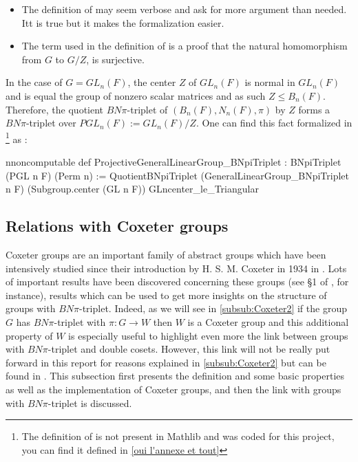 \begin{commentary}
    \begin{itemize}
        \item 
    The definition of  may seem verbose and ask for more argument than needed. Itt is true but it makes the formalization easier. 

\item The term   used in the definition of  is a proof that the natural homomorphism from $G$ to $G / Z$,  is surjective.
    \end{itemize}
\end{commentary}


\begin{ex}
    In the case of $G = GL_n(F)$, the center $Z$ of $GL_n(F)$ is normal in $GL_n(F)$ and is equal the group of nonzero scalar matrices and as such $Z \le B_n(F)$. Therefore, the quotient $BN\pi$-triplet of $\left( B_n(F),N_n(F), \pi \right)$ by $Z$ forms a $BN\pi$-triplet over $PGL_n\left( F \right) := GL_n(F)/Z$.
One can find this fact formalized in \footnote{The definition of  is not present in Mathlib and was coded for this project, you can find it defined in \ref{oui l'annexe et tout}} as :
\begin{leancode}
nnoncomputable
def ProjectiveGeneralLinearGroup_BNpiTriplet : BNpiTriplet (PGL n F) (Perm n) :=
  QuotientBNpiTriplet (GeneralLinearGroup_BNpiTriplet n F) (Subgroup.center (GL n F))  GLncenter_le_Triangular
\end{leancode}  
\end{ex}


\subsection{Relations with Coxeter groups}

    Coxeter groups are an important family of abstract groups which have been intensively studied since their introduction by H. S. M. Coxeter in 1934 in \cite{coxeter_discrete_1934}. 
   Lots of important results have been discovered concerning these groups (see §1 of \cite{bourbaki_groupes_2007}, for instance), results which can be used to get more insights on the structure of groups with $BN\pi$-triplet.
   Indeed, as we will see in \ref{subsub:Coxeter2} if the group $G$ has $BN\pi$-triplet with $\pi : G \to W$ then $W$ is a Coxeter group and this additional property of $W$ is especially useful to highlight even more the link between groups with $BN\pi$-triplet and double cosets. However, this link will not be really put forward in this report for reasons explained in \ref{subsub:Coxeter2} but can be found in \cite{bourbaki_groupes_2007}.
    This subsection first presents the definition and some basic properties as well as the \Lean implementation of Coxeter groups, and then the link with groups with $BN\pi$-triplet is discussed.

